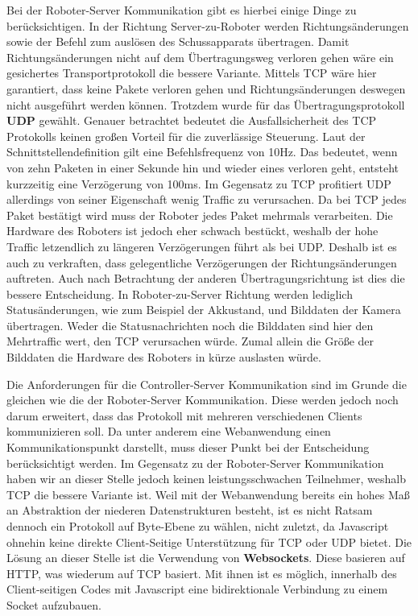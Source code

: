 Bei der Roboter-Server Kommunikation gibt es hierbei einige Dinge zu berücksichtigen. In der Richtung Server-zu-Roboter werden Richtungsänderungen sowie der Befehl zum auslösen des Schussapparats übertragen. Damit Richtungsänderungen nicht auf dem Übertragungsweg verloren gehen wäre ein gesichertes Transportprotokoll die bessere Variante. Mittels TCP wäre hier garantiert, dass keine Pakete verloren gehen und Richtungsänderungen deswegen nicht ausgeführt werden können. Trotzdem wurde für das Übertragungsprotokoll \textbf{UDP} gewählt. Genauer betrachtet bedeutet die Ausfallsicherheit des TCP Protokolls keinen großen Vorteil für die zuverlässige Steuerung. Laut der Schnittstellendefinition gilt eine Befehlsfrequenz von 10Hz. Das bedeutet, wenn von zehn Paketen in einer Sekunde hin und wieder eines verloren geht, entsteht kurzzeitig eine Verzögerung von 100ms. Im Gegensatz zu TCP profitiert UDP allerdings von seiner Eigenschaft wenig Traffic zu verursachen. Da bei TCP jedes Paket bestätigt wird muss der Roboter jedes Paket mehrmals verarbeiten. Die Hardware des Roboters ist jedoch eher schwach bestückt, weshalb der hohe Traffic letzendlich zu längeren Verzögerungen führt als bei UDP. Deshalb ist es auch zu verkraften, dass gelegentliche Verzögerungen der Richtungsänderungen auftreten. Auch nach Betrachtung der anderen Übertragungsrichtung ist dies die bessere Entscheidung. In Roboter-zu-Server Richtung werden lediglich Statusänderungen, wie zum Beispiel der Akkustand, und Bilddaten der Kamera übertragen. Weder die Statusnachrichten noch die Bilddaten sind hier den Mehrtraffic wert, den TCP verursachen würde. Zumal allein die Größe der Bilddaten die Hardware des Roboters in kürze auslasten würde.


Die Anforderungen für die Controller-Server Kommunikation sind im Grunde die gleichen wie die der Roboter-Server Kommunikation. Diese werden jedoch noch darum erweitert, dass das Protokoll mit mehreren verschiedenen Clients kommunizieren soll. Da unter anderem eine Webanwendung einen Kommunikationspunkt darstellt, muss dieser Punkt bei der Entscheidung berücksichtigt werden. Im Gegensatz zu der Roboter-Server Kommunikation haben wir an dieser Stelle jedoch keinen leistungsschwachen Teilnehmer, weshalb TCP die bessere Variante ist. Weil mit der Webanwendung bereits ein hohes Maß an Abstraktion der niederen Datenstrukturen besteht, ist es nicht Ratsam dennoch ein Protokoll auf Byte-Ebene zu wählen, nicht zuletzt, da Javascript ohnehin keine direkte Client-Seitige Unterstützung für TCP oder UDP bietet. Die Lösung an dieser Stelle ist die Verwendung von \textbf{Websockets}. Diese basieren auf HTTP, was wiederum auf TCP basiert. Mit ihnen ist es möglich, innerhalb des Client-seitigen Codes mit Javascript eine bidirektionale Verbindung zu einem Socket aufzubauen.  